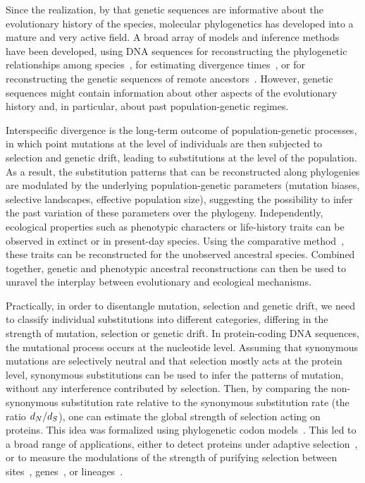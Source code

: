 \documentclass{article}
\begin{document}
    Since the realization, by \citet{Zuckerkandl1965} that genetic sequences are informative about the evolutionary history of the species, molecular phylogenetics has developed into a mature and very active field.
    A broad array of models and inference methods have been developed, using {DNA} sequences for reconstructing the phylogenetic relationships among species~\citep{Felsenstein1981}, for estimating divergence times~\citep{Thorne2002}, or for reconstructing the genetic sequences of remote ancestors~\citep{Liberles2007}.
    However, genetic sequences might contain information about other aspects of the evolutionary history and, in particular, about past population-genetic regimes.

    Interspecific divergence is the long-term outcome of population-genetic processes, in which point mutations at the level of individuals are then subjected to selection and {genetic drift}, leading to substitutions at the level of the population.
    As a result, the {substitution} patterns that can be reconstructed along phylogenies are modulated by the underlying population-genetic parameters (mutation biases, selective landscapes, effective population size), suggesting the possibility to infer the past variation of these parameters over the phylogeny.
    Independently, ecological properties such as phenotypic characters or life-history traits can be observed in extinct or in present-day species.
    Using the comparative method~\citep{Felsenstein1985}, these traits can be reconstructed for the unobserved ancestral species.
    Combined together, genetic and phenotypic ancestral reconstructions can then be used to unravel the interplay between evolutionary and ecological mechanisms.

    Practically, in order to disentangle mutation, selection and {genetic drift}, we need to classify individual substitutions into different categories, differing in the strength of mutation, selection or {genetic drift}.
    In protein-coding {DNA} sequences, the mutational process occurs at the nucleotide level.
    Assuming that {synonymous} mutations are selectively {neutral} and that selection mostly acts at the protein level, {synonymous} substitutions can be used to infer the patterns of mutation, without any interference contributed by selection.
    Then, by comparing the {non-synonymous} {substitution} rate relative to the {synonymous} {substitution} rate (the ratio $d_N / d_S$), one can estimate the global strength of selection acting on proteins.
    This idea was formalized using phylogenetic {codon} models~\citep{Muse1994,Goldman1994}.
    This led to a broad range of applications, either to detect proteins under adaptive selection~\citep{Kosiol2008}, or to measure the modulations of the strength of purifying selection between sites~\citep{Echave2016}, genes~\citep{Zhang2015}, or lineages~\citep{Lartillot2011}.
\end{document}
